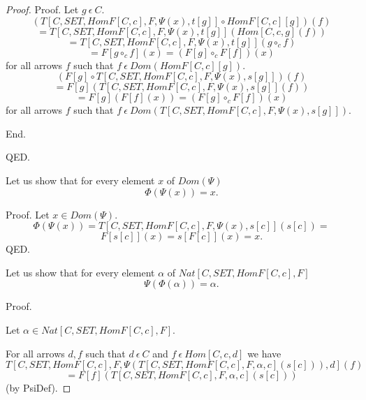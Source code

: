 \documentclass{article}
\newcommand{\mcirc}{\circ_{c}}
\newcommand{\inn}{~\epsilon~}
\newcommand{\innn}{~\epsilon~} %
\begin{document}
\begin{forthel}
\begin{proof}
			Proof.
			Let $g \innn C$.
			$$(T[C,SET,HomF[C,c],F,\Psi(x),t[g]] \circ HomF[C,c][g])(f)$$
			$$=T[C,SET,HomF[C,c],F,\Psi(x),t[g]](Hom[C,c,g](f))$$
			$$=T[C,SET,HomF[C,c],F,\Psi(x),t[g]](g \mcirc f)$$
			$$=F[g\mcirc f](x) = (F[g] \mcirc F[f])(x)$$ 
			for all arrows $f$ such that $f \inn Dom(HomF[C,c][g])$.
			$$(F[g] \circ T[C,SET,HomF[C,c],F,\Psi(x),s[g]])(f)$$
			$$=F[g](T[C,SET,HomF[C,c],F,\Psi(x),s[g]](f))$$
			$$=F[g](F[f](x)) = (F[g] \mcirc F[f])(x)$$ 
			for all arrows $f$ such that $f \inn Dom(T[C,SET,HomF[C,c],F,\Psi(x),s[g]]).$
			
			End.
			
		QED.


		Let us show that for every element $x$ of $Dom(\Psi)$ 
		$$\Phi(\Psi(x)) = x.$$

		
		Proof.
		Let $x \in Dom(\Psi)$.
		$$\Phi(\Psi(x)) = T[C,SET,HomF[C,c],F,\Psi(x),s[c]](s[c]) = $$
		$$F[s[c]](x) = s[F[c]](x) = x.$$
		QED.

		Let us show that for every element $\alpha$ of $Nat[C,SET,HomF[C,c],F]$
		$$\Psi(\Phi(\alpha)) = \alpha.$$
		
		Proof.
		
		Let $\alpha \in Nat[C,SET,HomF[C,c],F]$.
		
		For all arrows $d,f$ such that $d \inn C$ and $f\inn Hom[C,c,d]$ we have
		$$T[C,SET,HomF[C,c],F,\Psi(T[C,SET,HomF[C,c],F,\alpha,c](s[c])),d](f)$$ 
		$$=F[f](T[C,SET,HomF[C,c],F,\alpha,c](s[c]))$$
		(by PsiDef).


\end{proof}
\end{forthel}
\end{document}
